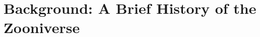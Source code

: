 \documentclass{sigchi}
\begin{document}
\section{Background: A Brief History of the Zooniverse}









\end{document}
